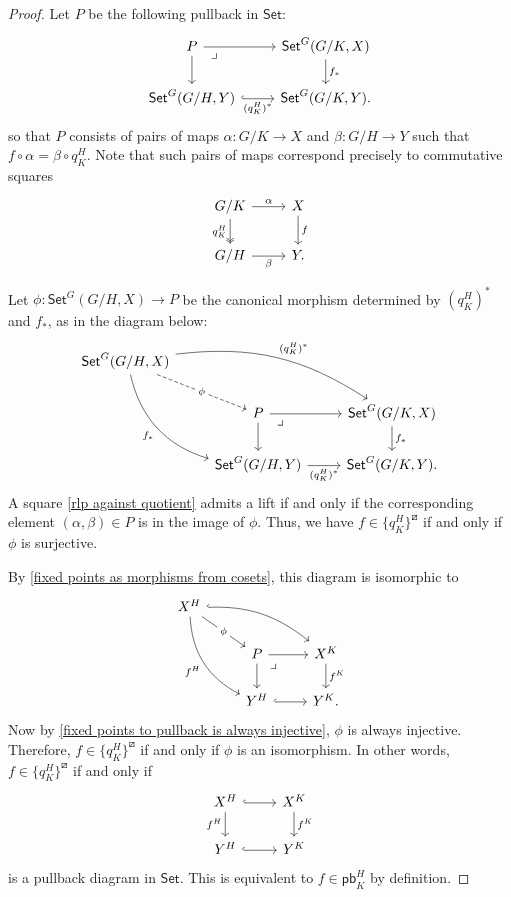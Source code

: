 \documentclass{amsart}
\newcommand{\Set}{\mathsf{Set}}
\newcommand{\GSet}{\Set^G}
\newcommand{\pb}{\mathsf{pb}}
\numberwithin{equation}{section}
\theoremstyle{definition}
\begin{document}
\begin{proof}
	Let $P$ be the following pullback in $\Set$:
	\[
		\begin{tikzcd}
			{P}
			\ar[dr, phantom, "\lrcorner" description, very near start]
			\ar[r]
			\ar[d]
			&
			{\GSet(G/K,X)}
			\ar[d, "f_*"]
			\\
			{\GSet(G/H,Y)}
			\ar[r, hook, "(q^H_K)^*"']
			&
			{\GSet(G/K,Y)}.
		\end{tikzcd}
	\]
	so that $P$ consists of pairs of maps $\alpha : G/K \to X$ and $\beta : G/H \to Y$ such that $f \circ \alpha = \beta \circ q^H_K$. Note that such pairs of maps correspond precisely to commutative squares
	\begin{equation}
		\label{rlp against quotient}
		\begin{tikzcd}
			G/K \ar[d, two heads, "q^H_K"']
			\ar[r, "\alpha"]
			&
			X
			\ar[d, "f"]
			\\
			G/H
			\ar[r, "\beta"']
			&
			Y.
		\end{tikzcd}
	\end{equation}


	Let $\phi \colon \GSet(G/H,X) \to P$ be the canonical morphism determined by $(q^H_K)^*$ and $f_*$, as in the diagram below:
	\[
		\begin{tikzcd}
			\GSet(G/H,X)
			\ar[drr, "(q^H_K)^*", bend left=20]
			\ar[ddr, "f_*"', bend right=30]
			\ar[dr, "\phi" description, dashed]
			\\
			&
			{P}
			\ar[dr, phantom, "\lrcorner" description, very near start]
			\ar[r]
			\ar[d]
			&
			{\GSet(G/K,X)}
			\ar[d, "f_*"]
			\\
			&
			{\GSet(G/H,Y)}
			\ar[r, "(q^H_K)^*"']
			&
			{\GSet(G/K,Y)}.
		\end{tikzcd}
	\]
	A square \eqref{rlp against quotient} admits a lift if and only if the corresponding element $(\alpha,\beta) \in P$ is in the image of $\phi$. Thus, we have $f \in \{q^H_K\}^{\boxslash}$ if and only if $\phi$ is surjective.

	By \cref{fixed points as morphisms from cosets}, this diagram is isomorphic to
	\[
		\begin{tikzcd}
			X^H
			\ar[drr, hook, bend left=20]
			\ar[ddr, "f^H"', bend right=30]
			\ar[dr, "\phi" description]
			\\
			&
			{P}
			\ar[dr, phantom, "\lrcorner" description, very near start]
			\ar[r]
			\ar[d]
			&
			{X^K}
			\ar[d, "f^K"]
			\\
			&
			{Y^H}
			\ar[r, hook]
			&
			{Y^K}.
		\end{tikzcd}
	\]
	Now by \cref{fixed points to pullback is always injective}, $\phi$ is always injective. Therefore, $f \in \{q^H_K\}^{\boxslash}$ if and only if $\phi$ is an isomorphism. In other words, $f \in \{q^H_K\}^{\boxslash}$ if and only if
	\[
		\begin{tikzcd}
			{X^H}
			\ar[r, hook]
			\ar[d, "f^H"']
			&
			{X^K}
			\ar[d, "f^K"]
			\\
			{Y^H}
			\ar[r, hook]
			&
			{Y^K}
		\end{tikzcd}
	\]
	is a pullback diagram in $\Set$. This is equivalent to $f \in \pb^H_K$ by definition.
\end{proof}
\end{document}
